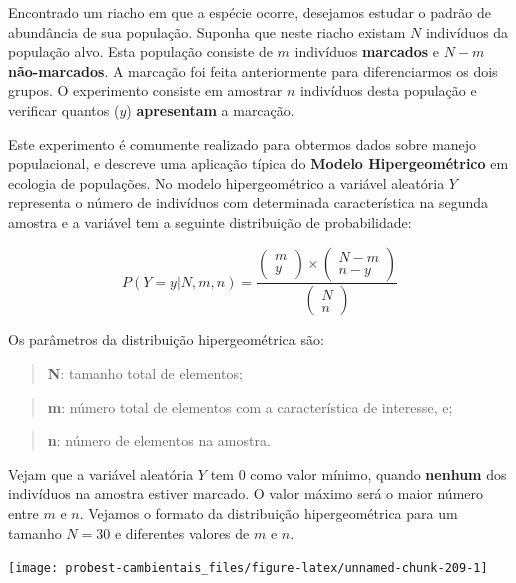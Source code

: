 \documentclass[
]{book}
\begin{document}
Encontrado um riacho em que a espécie ocorre, desejamos estudar o padrão de abundância de sua população. Suponha que neste riacho existam \(N\) indivíduos da população alvo. Esta população consiste de \(m\) indivíduos \textbf{marcados} e \(N-m\) \textbf{não-marcados}. A marcação foi feita anteriormente para diferenciarmos os dois grupos. O experimento consiste em amostrar \(n\) indivíduos desta população e verificar quantos (\(y\)) \textbf{apresentam} a marcação.

Este experimento é comumente realizado para obtermos dados sobre manejo populacional, e descreve uma aplicação típica do \textbf{Modelo Hipergeométrico} em ecologia de populações. No modelo hipergeométrico a variável aleatória \(Y\) representa o número de indivíduos com determinada característica na segunda amostra e a variável tem a seguinte distribuição de probabilidade:

\[P(Y=y|N,m,n) = \frac{\left (\begin{array}{c} m \\ y \end{array}\right) \times \left (\begin{array}{c} N-m \\ n-y \end{array}\right)}{\left (\begin{array}{c} N \\ n \end{array}\right)}\]

Os parâmetros da distribuição hipergeométrica são:

\begin{quote}
\textbf{N}: tamanho total de elementos;
\end{quote}

\begin{quote}
\textbf{m}: número total de elementos com a característica de interesse, e;
\end{quote}

\begin{quote}
\textbf{n}: número de elementos na amostra.
\end{quote}

Vejam que a variável aleatória \(Y\) tem \(0\) como valor mínimo, quando \textbf{nenhum} dos indivíduos na amostra estiver marcado. O valor máximo será o maior número entre \(m\) e \(n\). Vejamos o formato da distribuição hipergeométrica para um tamanho \(N = 30\) e diferentes valores de \(m\) e \(n\).

\begin{center}\texttt{[image: probest-cambientais\_files/figure-latex/unnamed-chunk-209-1]} \end{center}
\end{document}
